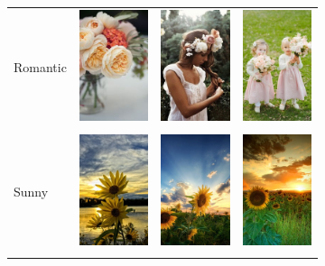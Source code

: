 \begin{figure}
\begin{subfigure}[t]{0.48\linewidth}
\begin{tabular}{m{.02in}|m{\dgap} m{\dgap} m{\dgap}}
    \begin{turn}{90}\small{Romantic}\end{turn} &
    \includegraphics[width=.53in]{../style/figures/flickr_on_pinterest/flower/pred_style_Romantic/h/0.jpg} &
    \includegraphics[width=.53in]{../style/figures/flickr_on_pinterest/flower/pred_style_Romantic/h/1.jpg} &
    \includegraphics[width=.53in]{../style/figures/flickr_on_pinterest/flower/pred_style_Romantic/h/3.jpg} \\ \\
    \begin{turn}{90}\small{Sunny}\end{turn} &
    \includegraphics[width=.53in]{../style/figures/flickr_on_pinterest/flower/pred_style_Sunny/h/0.jpg} &
    \includegraphics[width=.53in]{../style/figures/flickr_on_pinterest/flower/pred_style_Sunny/h/1.jpg} &
    \includegraphics[width=.53in]{../style/figures/flickr_on_pinterest/flower/pred_style_Sunny/h/2.jpg} \\ \\

\end{tabular}
\end{subfigure}
\end{figure}
